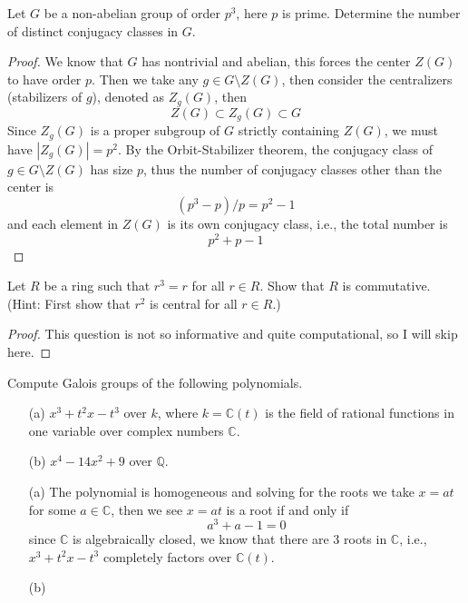 \documentclass[openany]{book}
\newcommand{\C}{\mathbb{C}}
\begin{document}
\begin{prob}
    Let \(G\) be a non-abelian group of order \(p^3\), here \(p\) is prime. Determine the number of distinct conjugacy classes in \(G\).
\end{prob}
\begin{proof}
    We know that $G$ has nontrivial and abelian, this forces the center $Z(G)$ to have order $p$. Then we take any $g\in G\setminus Z(G)$, then consider the centralizers (stabilizers of $g$), denoted as $Z_g(G)$, then 
    \begin{equation*}
        Z(G)\subset Z_g(G)\subset G
    \end{equation*}
    Since $Z_g(G)$ is a proper subgroup of $G$ strictly containing $Z(G)$, we must have $|Z_g(G)|=p^2$. By the Orbit-Stabilizer theorem, the conjugacy class of $g\in G\setminus Z(G)$ has size $p$, thus the number of conjugacy classes other than the center is 
    \begin{equation*}
        (p^3-p)/p=p^2-1
    \end{equation*}
    and each element in $Z(G)$ is its own conjugacy class, i.e., the total number is 
    \begin{equation*}
        p^2+p-1
    \end{equation*}
\end{proof}


\begin{prob}
    Let \(R\) be a ring such that \(r^3 = r\) for all \(r \in R\). Show that \(R\) is commutative. (Hint: First show that \(r^2\) is central for all \(r \in R\).)
\end{prob}
\begin{proof}
    This question is not so informative and quite computational, so I will skip here.
\end{proof}



\begin{prob}
    Compute Galois groups of the following polynomials.
    \begin{itemize}
        \item[(a)] \(x^3 + t^2x - t^3\) over \(k\), where \(k = \mathbb{C}(t)\) is the field of rational functions in one variable over complex numbers \(\mathbb{C}\).
        \item[(b)] \(x^4 - 14x^2 + 9\) over \(\mathbb{Q}\).
    \end{itemize}
\end{prob}
\begin{itemize}
    \item[(a)] The polynomial is homogeneous and solving for the roots we take $x=at$ for some $a\in\C$, then we see $x=at$ is a root if and only if 
    \begin{equation*}
        a^3+a-1=0
    \end{equation*}
    since $\C$ is algebraically closed, we know that there are $3$ roots in $\C$, i.e., $x^3+t^2x-t^3$ completely factors over $\C(t)$.
    \item[(b)] 
\end{itemize}
\end{document}
